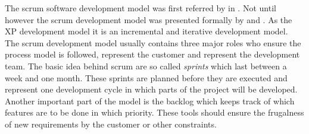 The scrum software development model was first referred by
\textcite{DeGrace1990} in \citeyear{DeGrace1990}. Not until
\citeyear{Sutherland1995} however the scrum development model was presented
formally by \textcite{Sutherland1995} and \textcite{Schwaber1995}. As the
\ac{XP} development model it is an incremental and iterative development model.
The scrum development model usually contains three major roles who ensure the
process model is followed, represent the customer and represent the development
team. The basic idea behind scrum are so called \emph{sprints} which last
between a week and one month. These sprints are planned before they are
executed and represent one development cycle in which parts of the project will
be developed. Another important part of the model is the backlog which keeps
track of which features are to be done in which priority. These tools should
ensure the frugalness of new requirements by the customer or other constraints.



